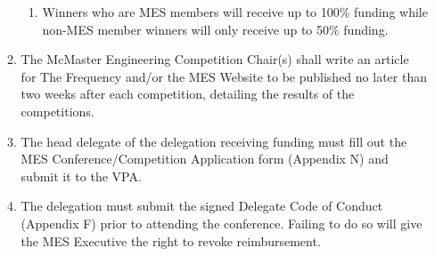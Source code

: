 \begin{enumerate}
\begin{enumerate}
    \begin{enumerate}
     \item
      Winners who are MES members will receive up to 100\% funding while
      non-MES member winners will only receive up to 50\% funding.
    \end{enumerate}
   \item
    The McMaster Engineering Competition Chair(s) shall write an article
    for The Frequency and/or the MES Website to be published no later
    than two weeks after each competition, detailing the results of the
    competitions.
   \item
    The head delegate of the delegation receiving funding must fill out
    the MES Conference/Competition Application form (Appendix N) and
    submit it to the VPA.
   \item
    The delegation must submit the signed Delegate Code of Conduct
    (Appendix F) prior to attending the conference. Failing to do so
    will give the MES Executive the right to revoke reimbursement.

  \end{enumerate}
\end{enumerate}

